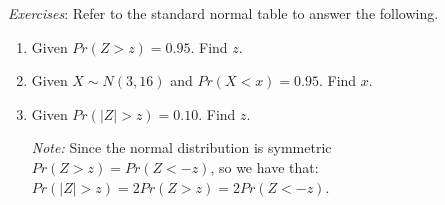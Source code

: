 \documentclass{./../handout}
\begin{document}
\textit{Exercises}: Refer to the standard normal table to answer the following.
\begin{enumerate}
  \item Given $Pr(Z>z) = 0.95 $. Find $z$. \vspace{3cm}
  \item Given  $X \sim N(3, 16)$ and $Pr(X<x) = 0.95 $. Find $x$. \vspace{4cm}
  \item Given $Pr(|Z|>z) = 0.10 $. Find $z$. \\ \vspace{-0.25cm}
 
  \textit{Note:} Since the normal distribution is symmetric $Pr(Z>z)=Pr(Z<-z)$, so we have that: $Pr(|Z|>z) = 2 Pr(Z>z) = 2 Pr(Z<-z) $. \\ 
 \vspace{3cm}
\end{enumerate}
\end{document}
